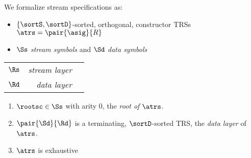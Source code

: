 \documentclass[10pt]{beamer}
\begin{document}
\begin{frame}%
  \frametitle{}%

We formalize stream specifications as:
\begin{itemize}
 \item $\{\sortS,\sortD\}$-sorted, orthogonal, constructor 
   TRSs $\atrs = \pair{\asig}{R}$
 \item $\Ss$ \emph{stream symbols} and $\Sd$ \emph{data symbols}
\end{itemize}

\begin{definition}
  \begin{center}
  \renewcommand{\arraystretch}{1.3}
  \begin{tabular}{crc}
    \cline{1-2}
    $\Rs$ & {\em stream layer}\\
      \cline{1-2}
    $\Rd$ & {\em data layer}\\
    \cline{1-2}
  \end{tabular}
  \end{center}
  \begin{enumerate}
    \item $\rootsc \in \Ss$ with arity 0, the \emph{root of\/ $\atrs$}.
    \item\label{def:scs:data}
       $\pair{\Sd}{\Rd}$ is a terminating, $\sortD$-sorted TRS, the \emph{data layer} of\/ $\atrs$.
    \item\label{def:scs:exhaustive}
      $\atrs$ is exhaustive%
  \end{enumerate}
\end{definition}


 
\end{frame}%
\end{document}
